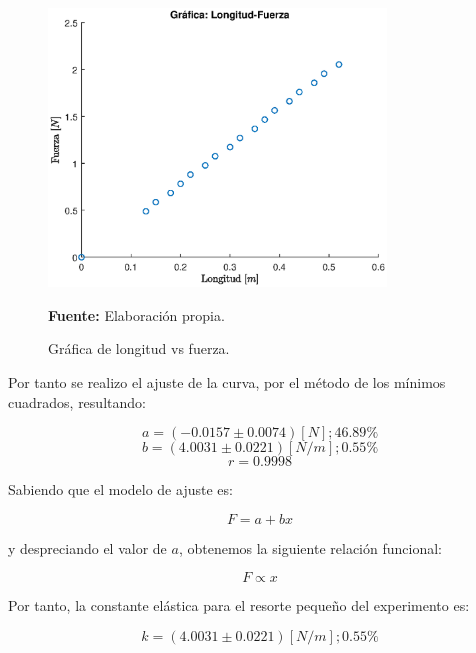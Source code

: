 \documentclass[letter,11pt]{article}
\newcommand{\source}[1]{\vspace{-11pt} \caption*{\small{\textbf{Fuente:} {#1}}}}
\begin{document}
\begin{figure}
\centering
\includegraphics[width=0.80\textwidth]{resources/m1.eps}
\caption{Gráfica de longitud vs fuerza.}
\label{figura3}
\source{Elaboración propia.}
\end{figure}

Por tanto se realizo el ajuste de la curva, por el método de los mínimos
cuadrados, resultando:

\begin{equation*}
    a = (-0.0157 \pm 0.0074) [N]; 46.89 \%
\end{equation*}
\begin{equation*}
    b = (4.0031 \pm 0.0221) [N/m]; 0.55 \%
\end{equation*}
\begin{equation*}
    r = 0.9998
\end{equation*}

Sabiendo que el modelo de ajuste es:

\begin{equation*}
    F = a + b x
\end{equation*}
\vspace{0.25cm}

y despreciando el valor de $a$, obtenemos la siguiente relación funcional:

\begin{equation*}
    F \propto x
\end{equation*}
\vspace{0.25cm}

Por tanto, la constante elástica para el resorte pequeño del experimento es:

\begin{equation*}
    k = (4.0031 \pm 0.0221) [N/m]; 0.55 \%
\end{equation*}
\vspace{0.25cm}
\end{document}

